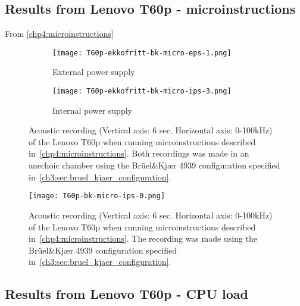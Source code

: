 \subsection{Results from Lenovo T60p - microinstructions}\label{subsec:t60p_bk_results_micro}
From \autoref{chp4:microinstructions} 
\begin{figure}[ht]
	\begin{subfigure}{0.8\textwidth}
	    \centering
	    \texttt{[image: T60p-ekkofritt-bk-micro-eps-1.png]}
	    \caption{External power supply}
	    \label{fig:T60p-ekkofritt-bk-micro-eps-1}
    \end{subfigure}
    \begin{subfigure}{0.8\textwidth}
	    \centering
    	\texttt{[image: T60p-ekkofritt-bk-micro-ips-3.png]}
    	\caption{Internal power supply}
    	\label{fig:T60p-ekkofritt-bk-micro-ips-3}
    \end{subfigure}
    \caption{Acoustic recording (Vertical axis: 6 sec. Horizontal axis: 0-100kHz) of the Lenovo T60p when running microinstructions described in~\autoref{chp4:microinstructions}. Both recordings was made in an anechoic chamber using the Brüel\&Kjær 4939 configuration specified in~\autoref{ch3:sec:bruel_kjaer_configuration}. }
	\label{fig:T60p-ekkofritt-bk-micro}
\end{figure}

\begin{figure}[ht]
    \centering
    \texttt{[image: T60p-bk-micro-ips-0.png]}
    \caption{Acoustic recording (Vertical axis: 6 sec. Horizontal axis: 0-100kHz) of the Lenovo T60p when running microinstructions described in~\autoref{chp4:microinstructions}. The recording was made using the Brüel\&Kjær 4939 configuration specified in~\autoref{ch3:sec:bruel_kjaer_configuration}. }
    \label{fig:T60p-bk-micro-ips-0}
\end{figure}

\subsection{Results from Lenovo T60p - CPU load}\label{subsec:t60p_bk_results_cpuload}

